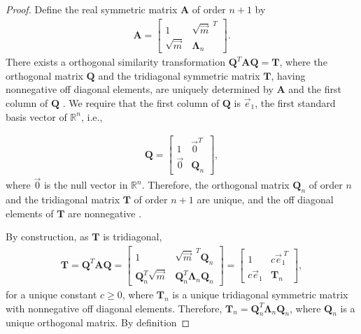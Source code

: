 \documentclass[english,12pt]{ttuthes}
\begin{document}
% 
\begin{proof}
%  
Define the real symmetric matrix $\mathbf{A}$ of order $n+1$ by  
%
\begin{align}
  \mathbf{A}=
  \left[
  \begin{matrix}
    1                  &\sqrt{\vec{m}}^{\;T}\\
    \sqrt{\vec{m}}  &\mathbf{\Lambda}_n
  \end{matrix}
  \right].  
\end{align}
%
There exists a orthogonal similarity transformation
$\mathbf{Q}^T\mathbf{A}\mathbf{Q}=\mathbf{T}$, where the orthogonal
matrix $\mathbf{Q}$ and the tridiagonal symmetric matrix $\mathbf{T}$,
having nonnegative off diagonal elements, are uniquely determined by
$\mathbf{A}$ and the first column of $\mathbf{Q}$
\cite{Parlett:1980}. We require that the first column of $\mathbf{Q}$
is $\vec{e}_1$, the first standard basis vector of $\mathbb{R}^n$, i.e.,

% 
\begin{align}   
  \mathbf{Q}=
  \left[
  \begin{matrix}
    1           &\vec{0}^{T}\\
    \vec{0}  &\mathbf{Q}_n
  \end{matrix}
  \right],
\end{align}
%
where $\vec{0}$ is the null vector in $\mathbb{R}^n$. Therefore, the
orthogonal matrix $\mathbf{Q}_n$ of order $n$ and the 
tridiagonal matrix $\mathbf{T}$ of order $n+1$ are unique, and the
off diagonal elements of $\mathbf{T}$ are nonnegative
\cite{Parlett:1980}.

By construction, as $\mathbf{T}$ is tridiagonal,
%
\begin{align}
  \mathbf{T}=\mathbf{Q}^T\mathbf{A}\mathbf{Q}=
%
  \left[
    \begin{matrix}
    1           &\sqrt{\vec{m}}^{\;T}\mathbf{Q}_n\\
    \mathbf{Q}_n^T\sqrt{\vec{m}}  &\mathbf{Q}_n^T\mathbf{\Lambda}_n\mathbf{Q}_n
  \end{matrix}
  \right]
%  
  =
%
  \left[
  \begin{matrix}
    1           &c\vec{e}_1^{\;T}\\
    c\vec{e}_1  & \mathbf{T}_n
  \end{matrix}
  \right],  
\end{align}
%
for a unique constant $c\geq0$, where $\mathbf{T}_n$ is a unique
tridiagonal symmetric matrix with nonnegative off diagonal elements. Therefore, 
$\mathbf{T}_n=\mathbf{Q}_n^T\mathbf{\Lambda}_n\mathbf{Q}_n$, where
$\mathbf{Q}_n$ is a unique orthogonal matrix. By definition


\end{proof}
\end{document}
